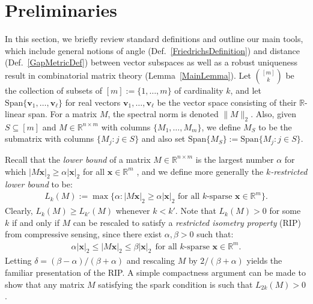 \documentclass[journal, onecolumn]{IEEEtran}
\begin{document}
\section{Preliminaries}\label{Preliminaries}
In this section, we briefly review standard definitions and outline our main tools, which include general notions of angle (Def.~\ref{FriedrichsDefinition}) and distance (Def.~\ref{GapMetricDef}) between vector subspaces as well as a robust uniqueness result in combinatorial matrix theory (Lemma~\ref{MainLemma}).
Let ${[m] \choose k}$ be the collection of subsets of $[m] := \{1,\ldots,m\}$ of cardinality $k$, and let $\text{Span}\{\mathbf{v}_1, \ldots, \mathbf{v}_\ell\}$ for real vectors $\mathbf{v}_1, \ldots, \mathbf{v}_\ell$ be the vector space consisting of their $\mathbb{R}$-linear span.  For a matrix $M$, the spectral norm is denoted $\|M\|_2$.
%
%
Also, given $S \subseteq [m]$ and $M \in \mathbb{R}^{n \times m}$ with columns $\{M_1,\ldots,M_m\}$, we define $M_S$ to be the submatrix with columns $\{M_j: j \in S\}$ and also set $\text{Span}\{M_S\} := \text{Span}\{M_j : j \in S\}$.  

Recall that the \emph{lower bound} of a matrix $M \in \mathbb{R}^{n \times m}$ is the largest number $\alpha$ for which $|M\mathbf{x}|_2 \geq \alpha|\mathbf{x}|_2$ for all $\mathbf{x} \in \mathbb{R}^m$ \cite{grcar2010matrix}, and we define more generally the \textit{$k$-restricted lower bound} to be:
\begin{align}
L_k(M) := \max \{ \alpha : |M\mathbf{x}|_2 \geq \alpha|\mathbf{x}|_2 \text{ for all $k$-sparse } \mathbf{x} \in \mathbb{R}^m\}.
\end{align}
Clearly, $L_k(M) \geq L_{k'}(M)$ whenever $k < k'$. Note that $L_k(M) > 0$ for some $k$ if and only if $M$ can be rescaled to satisfy a \emph{restricted isometry property} (RIP) \cite{CandesTao05} from compressive sensing, since there exist $\alpha, \beta > 0$ such that:
\begin{align}
\alpha|\mathbf{x}|_2 \leq |M\mathbf{x}|_2 \leq \beta|\mathbf{x}|_2 \ \ \text{for all $k$-sparse } \mathbf{x} \in \mathbb{R}^m.
\end{align}
Letting $\delta = (\beta - \alpha)/(\beta + \alpha)$ and rescaling $M$ by $2/(\beta + \alpha)$ yields the familiar presentation of the RIP. A simple compactness argument can be made to show that any matrix $M$ satisfying the spark condition is such that $L_{2k}(M) > 0$. 
\end{document}
